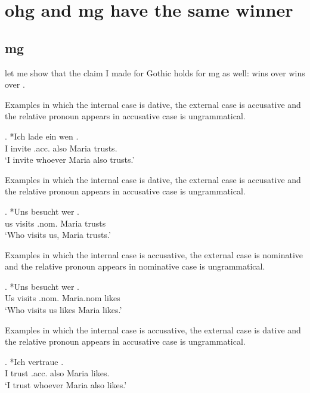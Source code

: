 \section{\ac{ohg} and \ac{mg} have the same winner}

\subsection{\ac{mg}}

let me show that the claim I made for Gothic holds for \ac{mg} as well:  wins over  wins over .

Examples in which the internal case is dative, the external case is accusative and the relative pronoun appears in accusative case is ungrammatical.

\exg. *Ich {lade ein} wen   . \\
 I invite\scsub{[acc]} .\ac{acc}. also Maria trusts\scsub{[dat]}.\\
 `I invite whoever Maria also trusts.' \label{ex:mg-acc-dat-u}

Examples in which the internal case is dative, the external case is accusative and the relative pronoun appears in accusative case is ungrammatical.

\exg. *Uns besucht wer  .\\
 us visits\scsub{[nom]} .\ac{nom}. Maria trusts\scsub{[dat]}\\
 `Who visits us, Maria trusts.' 

Examples in which the internal case is accusative, the external case is nominative and the relative pronoun appears in nominative case is ungrammatical.

\exg. *Uns besucht wer  .\\
 Us visits\scsub{[nom]} .\ac{nom}. Maria.\ac{nom} likes\scsub{[acc]}\\
 `Who visits us likes Maria likes.' \label{ex:mg-nom-acc-u}

Examples in which the internal case is accusative, the external case is dative and the relative pronoun appears in accusative case is ungrammatical.

\exg. *Ich vertraue    . \\
 I trust\scsub{[dat]} .\ac{acc}. also Maria likes\scsub{[acc]}.\\
 `I trust whoever Maria also likes.' 

